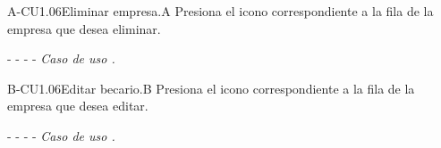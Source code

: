 \begin{UCtrayectoriaA}{A-CU1.06}{Eliminar empresa.}{A}
	     \UCpaso[\UCactor]Presiona el icono  \faTrashO  correspondiente a la fila de la empresa que desea eliminar.
	     
	    \item[- -] - - {\em Caso de uso .}
	\end{UCtrayectoriaA}


\begin{UCtrayectoriaA}{B-CU1.06}{Editar becario.}{B}
	     \UCpaso[\UCactor]Presiona el icono  \faEdit correspondiente a la fila de la empresa que desea editar.
	     
	    \item[- -] - - {\em Caso de uso .}
	\end{UCtrayectoriaA}
